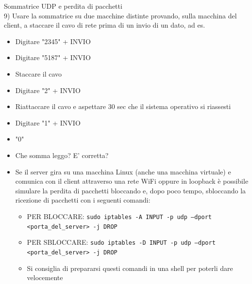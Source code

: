 \documentclass[11pt]{article}
\begin{document}
\begin{tcolorbox}[colback=blue!5!white,colframe=blue!75!black,title=\textbf{DOMANDA}, breakable]
Sommatrice UDP e perdita di pacchetti\\
9) Usare la sommatrice su due macchine distinte provando, sulla macchina del client, a staccare il cavo di rete prima di un invio di un dato, ad es.
\begin{itemize}
    \item Digitare "2345" + INVIO
    \item Digitare "5187" + INVIO
    \item Staccare il cavo
    \item Digitare "2" + INVIO
    \item Riattaccare il cavo e aspettare 30 sec che il sistema operativo si riassesti
    \item Digitare "1" + INVIO
    \item "0"
\end{itemize}
\begin{itemize}
    \item Che somma leggo? E' corretta?
    \item Se il server gira su una macchina Linux (anche una macchina virtuale) e comunica con il client attraverso una rete WiFi oppure in loopback è possibile simulare la perdita di pacchetti bloccando e, dopo poco tempo, sbloccando la ricezione di pacchetti con i seguenti comandi:
    \begin{itemize}
        \item PER BLOCCARE: \texttt{sudo iptables -A INPUT -p udp --dport <porta\_del\_server> -j DROP}
        \item PER SBLOCCARE: \texttt{sudo iptables -D INPUT -p udp --dport <porta\_del\_server> -j DROP}
        \item Si consiglia di prepararsi questi comandi in una shell per poterli dare velocemente
    \end{itemize}
\end{itemize}
\end{tcolorbox}
\end{document}

